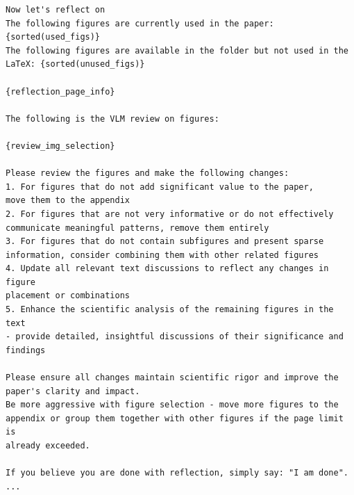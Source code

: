 \documentclass[11pt, a4paper]{include/gdm_format}
\begin{document}
\begin{tcolorbox}[breakable, colback=orange!5!white, colframe=orange!75!black, title=VLM Reflection Prompt]
\small
\begin{verbatim}
Now let's reflect on
The following figures are currently used in the paper: 
{sorted(used_figs)}
The following figures are available in the folder but not used in the 
LaTeX: {sorted(unused_figs)}

{reflection_page_info}

The following is the VLM review on figures:

{review_img_selection}

Please review the figures and make the following changes:
1. For figures that do not add significant value to the paper, 
move them to the appendix
2. For figures that are not very informative or do not effectively 
communicate meaningful patterns, remove them entirely
3. For figures that do not contain subfigures and present sparse 
information, consider combining them with other related figures
4. Update all relevant text discussions to reflect any changes in figure 
placement or combinations
5. Enhance the scientific analysis of the remaining figures in the text 
- provide detailed, insightful discussions of their significance and findings

Please ensure all changes maintain scientific rigor and improve the 
paper's clarity and impact.
Be more aggressive with figure selection - move more figures to the 
appendix or group them together with other figures if the page limit is 
already exceeded.

If you believe you are done with reflection, simply say: "I am done".
...
\end{verbatim}
\end{tcolorbox}
\end{document}
